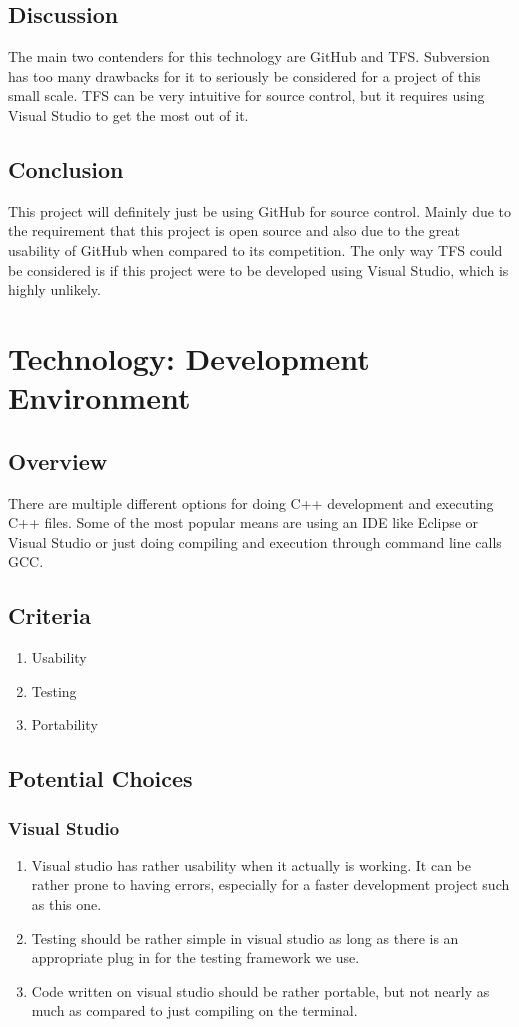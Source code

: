 \documentclass[onecolumn, draftclsnofoot,10pt, compsoc]{IEEEtran}
\begin{document}
\subsection{Discussion}
The main two contenders for this technology are GitHub and TFS. Subversion has too many drawbacks for it to seriously be considered for a project of this small scale. TFS can be very intuitive for source control, but it requires using Visual Studio to get the most out of it.

\subsection{Conclusion}
This project will definitely just be using GitHub for source control. Mainly due to the requirement that this project is open source and also due to the great usability of GitHub when compared to its competition. The only way TFS could be considered is if this project were to be developed using Visual Studio, which is highly unlikely.

\section{Technology: Development Environment}

\subsection{Overview}
There are multiple different options for doing C++ development and executing C++ files. Some of the most popular means are using an IDE like Eclipse or Visual Studio or just doing compiling and execution through command line calls GCC.
\subsection{Criteria}
\begin{enumerate}
\item Usability
\item Testing
\item Portability
\end{enumerate}

\subsection{Potential Choices}

\subsubsection{Visual Studio}
\begin{enumerate}
\item Visual studio has rather usability when it actually is working. It can be rather prone to having errors, especially for a faster development project such as this one.
\item Testing should be rather simple in visual studio as long as there is an appropriate plug in for the testing framework we use.
\item Code written on visual studio should be rather portable, but not nearly as much as compared to just compiling on the terminal.
\end{enumerate}
\end{document}
